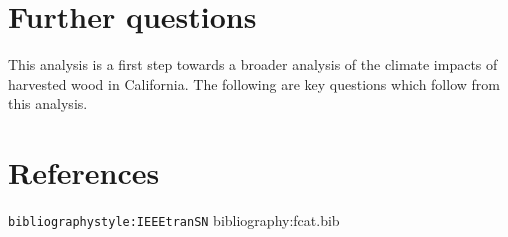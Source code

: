 \documentclass[a4paper]{article}
\begin{document}
\section{Further questions}
\label{sec-4}

This analysis is a first step towards a broader analysis of the
climate impacts of harvested wood in California. The following are key
questions which follow from this analysis.

\section{References}
\label{sec-5}
\texttt{bibliographystyle:IEEEtranSN}
bibliography:fcat.bib
\end{document}
